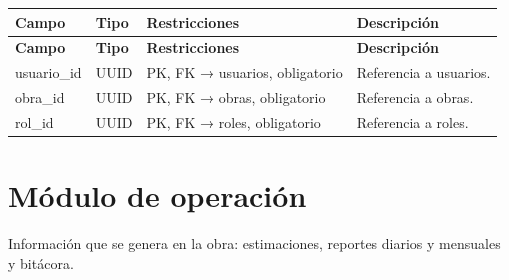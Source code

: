 \begin{xltabular}{\linewidth}{@{}>{\ttfamily\footnotesize}p{4.9cm}>{\ttfamily\footnotesize}p{2.4cm}>{\raggedright\arraybackslash\footnotesize}p{3.3cm}>{\footnotesize}X@{}}
\toprule\normalfont\sffamily\bfseries\footnotesize Campo & \normalfont\sffamily\bfseries\footnotesize Tipo & \sffamily\bfseries Restricciones & \sffamily\bfseries Descripción\\\midrule\endfirsthead
\toprule\normalfont\sffamily\bfseries\footnotesize Campo & \normalfont\sffamily\bfseries\footnotesize Tipo & \sffamily\bfseries Restricciones & \sffamily\bfseries Descripción\\\midrule\endhead
\bottomrule\endfoot
usuario\_id & UUID & PK, FK → usuarios, obligatorio & Referencia a usuarios.\\
obra\_id & UUID & PK, FK → obras, obligatorio & Referencia a obras.\\
rol\_id & UUID & PK, FK → roles, obligatorio & Referencia a roles.\\
\end{xltabular}

\section{Módulo de operación}
Información que se genera en la obra: estimaciones, reportes diarios y mensuales y bitácora.

